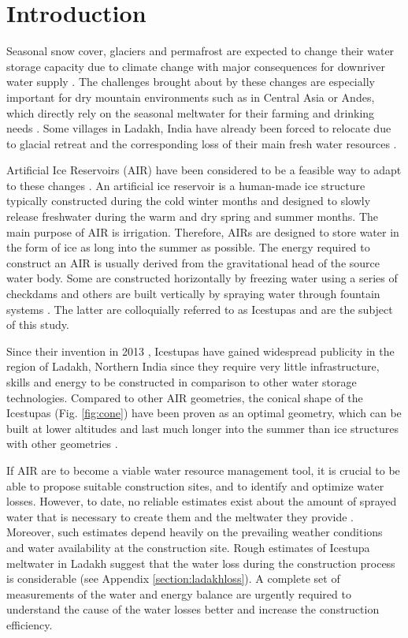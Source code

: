 \documentclass[utf8]{frontiersSCNS} %
\begin{document}
\section{Introduction}

Seasonal snow cover, glaciers and permafrost are expected to change their water
storage capacity due to climate change with major consequences for downriver
water supply \citep{Immerzeel_2020}. The challenges brought about by these
changes are especially important for dry mountain environments such as in
Central Asia or Andes, which directly rely on the seasonal meltwater for their
farming and drinking needs \citep{HoelzleBarandun_2019, Apel_2018,
Buytaert_2017, Chen_2016, UNGERSHAYESTEH_2013}. Some villages in Ladakh, India
have already been forced to relocate due to glacial retreat and the
corresponding loss of their main fresh water resources \citep{zanskar}. 

Artificial Ice Reservoirs (AIR) have been considered to be a feasible way to
adapt to these changes \citep{IPCC_2019, 10.1659/MRD-JOURNAL-D-18-00072.1}. An
artificial ice reservoir is a human-made ice structure typically constructed
during the cold winter months and designed to slowly release freshwater during
the warm and dry spring and summer months. The main purpose of AIR is
irrigation. Therefore, AIRs are designed to store water in the form of ice as
long into the summer as possible. The energy required to construct an AIR is
usually derived from the gravitational head of the source water body. Some are
constructed horizontally by freezing water using a series of checkdams and
others are built vertically by spraying water through fountain systems
\citep{Nusser_2018}. The latter are colloquially referred to as Icestupas and
are the subject of this study.

Since their invention in 2013 \citep{campaign}, Icestupas have gained widespread publicity in the region of Ladakh,
Northern India since they require very little infrastructure, skills and energy to be constructed in comparison to other
water storage technologies. Compared to other AIR geometries, the conical shape of the Icestupas (Fig. \ref{fig:cone})
have been proven as an optimal geometry, which can be built at lower altitudes and last much longer into the summer than
ice structures with other geometries \citep{campaign}.

If AIR are to become a viable water resource management tool, it is crucial to be able to propose suitable construction
sites, and to identify and optimize water losses. However, to date, no reliable estimates exist about the amount of
sprayed water that is necessary to create them and the meltwater they provide \citep{Nusser_2018}. Moreover, such
estimates depend heavily on the prevailing weather conditions and water availability at the construction site. Rough
estimates of Icestupa meltwater in Ladakh suggest that the water loss during the construction process is considerable
(see Appendix \ref{section:ladakhloss}). A complete set of measurements of the water and energy balance are urgently
required to understand the cause of the water losses better and increase the construction efficiency.
\end{document}
